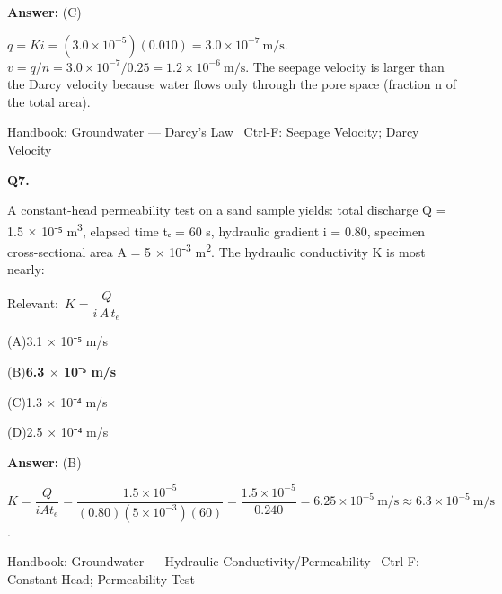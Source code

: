 \documentclass[11pt]{article}
\newcommand{\correct}[1]{\textbf{#1}\;{\color{accent}$\checkmark$}}
\newcommand{\optline}[2]{\par\noindent\hspace{1.2em}(#1)\hspace{0.6em}#2}
\begin{document}
\vspace{2pt}\par\noindent\colorbox{boxbg}{\parbox{\dimexpr\linewidth-2\fboxsep\relax}{%
\vspace{2pt}\textbf{Answer:} (C)\par\vspace{2pt}
{\small $q = Ki = (3.0\times10^{-5})(0.010) = 3.0\times10^{-7}\ \mathrm{m/s}$.  $v = q/n = 3.0\times10^{-7}/0.25 = 1.2\times10^{-6}\ \mathrm{m/s}$. The seepage velocity is larger than the Darcy velocity because water flows only through the pore space (fraction n of the total area).}\par\vspace{2pt}
{\footnotesize\color{soft}Handbook: Groundwater --- Darcy's Law \textbullet\ Ctrl-F: Seepage Velocity; Darcy Velocity}\vspace{2pt}
}}
\vspace{9pt}
\filbreak
\textbf{\color{accent}Q7.}\par\vspace{2pt}
A constant-head permeability test on a sand sample yields: total discharge Q = 1.5 $\times$ 10⁻⁵ m\textsuperscript{3}, elapsed time tₑ = 60 s, hydraulic gradient i = 0.80, specimen cross-sectional area A = 5 $\times$ 10⁻\textsuperscript{3} m\textsuperscript{2}. The hydraulic conductivity K is most nearly:\par\vspace{3pt}
{\small\color{soft}Relevant:}\ $K = \dfrac{Q}{i\,A\,t_e}$\par\vspace{3pt}
\optline{A}{3.1 $\times$ 10⁻⁵ m/s}
\optline{B}{\correct{6.3 $\times$ 10⁻⁵ m/s}}
\optline{C}{1.3 $\times$ 10⁻⁴ m/s}
\optline{D}{2.5 $\times$ 10⁻⁴ m/s}
\par\vspace{3pt}
\vspace{2pt}\par\noindent\colorbox{boxbg}{\parbox{\dimexpr\linewidth-2\fboxsep\relax}{%
\vspace{2pt}\textbf{Answer:} (B)\par\vspace{2pt}
{\small $K = \dfrac{Q}{iAt_e} = \dfrac{1.5\times10^{-5}}{(0.80)(5\times10^{-3})(60)} = \dfrac{1.5\times10^{-5}}{0.240} = 6.25\times10^{-5}\ \mathrm{m/s} \approx 6.3\times10^{-5}\ \mathrm{m/s}$.}\par\vspace{2pt}
{\footnotesize\color{soft}Handbook: Groundwater --- Hydraulic Conductivity/Permeability \textbullet\ Ctrl-F: Constant Head; Permeability Test}\vspace{2pt}
}}
\end{document}
